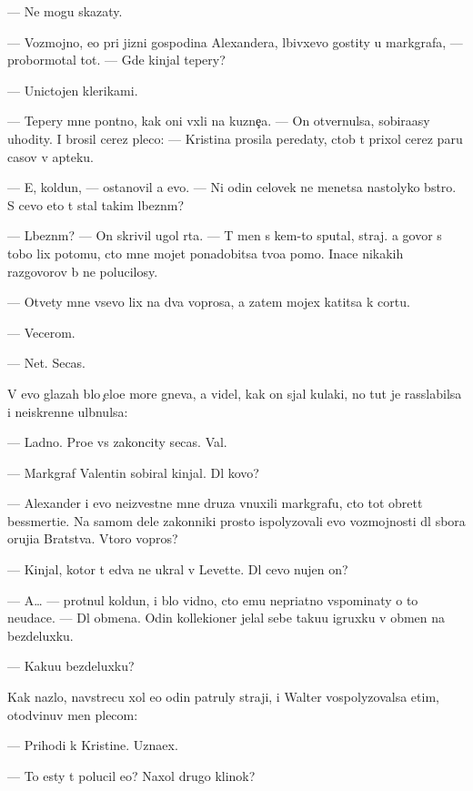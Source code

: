 \documentclass[10pt]{book}
\begin{document}
— Ne mogu skazaty.

— Voz\-moj\-no, {\y}e{\x}o pri jizni gospodina Alexandera, l{\io}bivxevo gostity u markgrafa, — probormotal tot. — Gde kinjal tepery?

— Unictojen klerikami.

— Tepery mne pon{\ia}tno, kak oni v{\yi}xli na kuzne{\c}a. — On otvernulsa, sobira{\y}asy uhodity. I brosil cerez pleco: — Kristina prosila peredaty, ctob{\yi} t{\yi} prixol cerez paru casov v apteku.

— E{\y}, koldun, — ostanovil {\y}a {\y}evo. — Ni odin celovek ne men{\ia}{\y}etsa nastolyko b{\yi}stro. S cevo eto t{\yi} stal takim l{\io}bezn{\yi}m?

— L{\io}bezn{\yi}m? — On skrivil ugol rta. — T{\yi} men{\ia} s kem-to sputal, straj. {\Y}a govor{\io} s tobo{\y} lix potomu, cto mne mojet ponadobitsa tvo{\y}a pomo{\x}. Inace nikakih razgovorov b{\yi} ne polucilosy.

— Otvety mne vsevo lix na dva voprosa, a zatem mojex katitsa k cortu.

— Vecerom.

— Net. Se{\y}cas.

V {\y}evo glazah b{\yi}lo {\c}elo{\y}e more gneva, {\y}a videl, kak on sjal kulaki, no tut je rasslabilsa i neiskrenne ul{\yi}bnulsa:

— Ladno. Pro{\x}e vs{\e} zakoncity se{\y}cas. Val{\ia}{\y}.

— Markgraf Valentin sobiral kinjal{\yi}. Dl{\ia} kovo?

— Alexander i {\y}evo neizvestn{\yi}{\y}e mne druz{\y}a vnuxili markgrafu, cto tot obret{\e}t bessmerti{\y}e. Na samom dele zakonniki prosto ispolyzovali {\y}evo vozmojnosti dl{\ia} sbo\-ra oruji{\y}a Bratstva. Vtoro{\y} vopros?

— Kinjal, kotor{\yi}{\y} t{\yi} {\y}edva ne ukral v Levette. Dl{\ia} cevo nujen on?

— A… — pro\-t{\ia}\-nul koldun, i b{\yi}lo vidno, cto {\y}emu nepri{\y}atno vspominaty o to{\y} neudace. — Dl{\ia} obmena. Odin kollek\-{\c}ioner jelal sebe taku{\y}u igruxku v obmen na bezdeluxku.

— Kaku{\y}u bezdeluxku?

Kak nazlo, navstrecu xol {\y}e{\x}o odin patruly straji, i Walter vospolyzovalsa etim, otodvinuv men{\ia} plecom:

— Prihodi k Kristine. Uzna{\y}ex.

— To {\y}esty t{\yi} polucil {\y}e{\y}o? Naxol drugo{\y} klinok?
\end{document}

